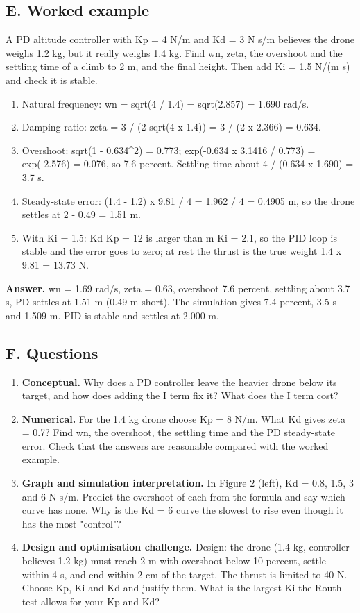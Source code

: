 \documentclass[11pt,a4paper]{article}
\begin{document}
\subsection*{E. Worked example}
A PD altitude controller with Kp = 4 N/m and Kd = 3 N s/m believes the drone weighs 1.2 kg, but it really weighs 1.4 kg. Find wn, zeta, the overshoot and the settling time of a climb to 2 m, and the final height. Then add Ki = 1.5 N/(m s) and check it is stable.
\begin{enumerate}[nosep]
\item Natural frequency: wn = sqrt(4 / 1.4) = sqrt(2.857) = 1.690 rad/s.
\item Damping ratio: zeta = 3 / (2 sqrt(4 x 1.4)) = 3 / (2 x 2.366) = 0.634.
\item Overshoot: sqrt(1 - 0.634\textasciicircum{}2) = 0.773; exp(-0.634 x 3.1416 / 0.773) = exp(-2.576) = 0.076, so 7.6 percent. Settling time about 4 / (0.634 x 1.690) = 3.7 s.
\item Steady-state error: (1.4 - 1.2) x 9.81 / 4 = 1.962 / 4 = 0.4905 m, so the drone settles at 2 - 0.49 = 1.51 m.
\item With Ki = 1.5: Kd Kp = 12 is larger than m Ki = 2.1, so the PID loop is stable and the error goes to zero; at rest the thrust is the true weight 1.4 x 9.81 = 13.73 N.
\end{enumerate}
\textbf{Answer.} wn = 1.69 rad/s, zeta = 0.63, overshoot 7.6 percent, settling about 3.7 s, PD settles at 1.51 m (0.49 m short). The simulation gives 7.4 percent, 3.5 s and 1.509 m. PID is stable and settles at 2.000 m.

\subsection*{F. Questions}
\begin{enumerate}[nosep]
\item \textbf{Conceptual.} Why does a PD controller leave the heavier drone below its target, and how does adding the I term fix it? What does the I term cost?
\item \textbf{Numerical.} For the 1.4 kg drone choose Kp = 8 N/m. What Kd gives zeta = 0.7? Find wn, the overshoot, the settling time and the PD steady-state error. Check that the answers are reasonable compared with the worked example.
\item \textbf{Graph and simulation interpretation.} In Figure 2 (left), Kd = 0.8, 1.5, 3 and 6 N s/m. Predict the overshoot of each from the formula and say which curve has none. Why is the Kd = 6 curve the slowest to rise even though it has the most "control"?
\item \textbf{Design and optimisation challenge.} Design: the drone (1.4 kg, controller believes 1.2 kg) must reach 2 m with overshoot below 10 percent, settle within 4 s, and end within 2 cm of the target. The thrust is limited to 40 N. Choose Kp, Ki and Kd and justify them. What is the largest Ki the Routh test allows for your Kp and Kd?
\end{enumerate}
\end{document}
